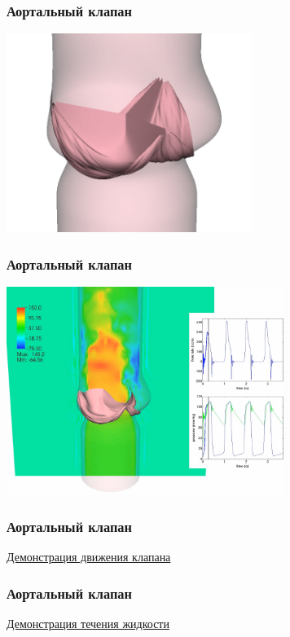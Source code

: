 \documentclass[14pt, notes]{beamer}
\begin{document}
\begin{frame}
\frametitle{Аортальный клапан}
    \begin{center}
	\includegraphics[width=8cm]{immersed_boundary/valve_vessel_side_crop.jpg}
    \end{center}
\end{frame}

\begin{frame}
\frametitle{Аортальный клапан}
    \begin{center}
	\includegraphics[width=9cm]{immersed_boundary/shot0002.png}
    \end{center}
\end{frame}

\begin{frame}
\frametitle{Аортальный клапан}
    \begin{center}
        \href{run:video/valve\_top.mov}{Демонстрация движения клапана}
    \end{center}
\end{frame}

\begin{frame}
\frametitle{Аортальный клапан}
    \begin{center}
        \href{run:video/valve\_flow\_side.mov}{Демонстрация течения жидкости}
    \end{center}
\end{frame}
\end{document}

